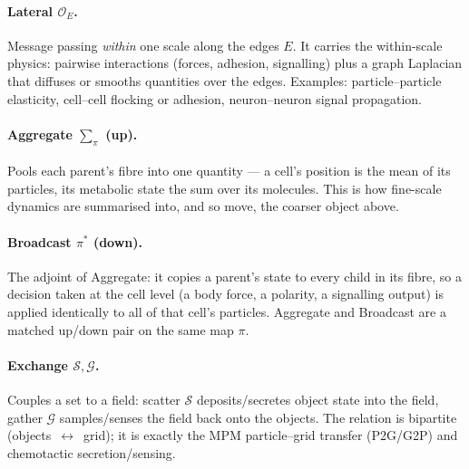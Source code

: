 \documentclass[11pt]{article}
\begin{document}
\paragraph{Lateral $\mathcal{O}_E$.} Message passing \emph{within} one scale along
the edges $E$. It carries the within-scale physics: pairwise interactions (forces,
adhesion, signalling) plus a graph Laplacian that diffuses or smooths quantities
over the edges. Examples: particle--particle elasticity, cell--cell flocking or
adhesion, neuron--neuron signal propagation.

\paragraph{Aggregate $\textstyle\sum_\pi$ (up).} Pools each parent's fibre into one
quantity --- a cell's position is the mean of its particles, its metabolic state the
sum over its molecules. This is how fine-scale dynamics are summarised into, and so
move, the coarser object above.

\paragraph{Broadcast $\pi^{*}$ (down).} The adjoint of Aggregate: it copies a
parent's state to every child in its fibre, so a decision taken at the cell level
(a body force, a polarity, a signalling output) is applied identically to all of
that cell's particles. Aggregate and Broadcast are a matched up/down pair on the
same map $\pi$.

\paragraph{Exchange $\mathcal{S},\mathcal{G}$.} Couples a set to a field: scatter
$\mathcal{S}$ deposits/secretes object state into the field, gather $\mathcal{G}$
samples/senses the field back onto the objects. The relation is bipartite
(objects~$\leftrightarrow$~grid); it is exactly the MPM particle--grid transfer
(P2G/G2P) and chemotactic secretion/sensing.
\end{document}
